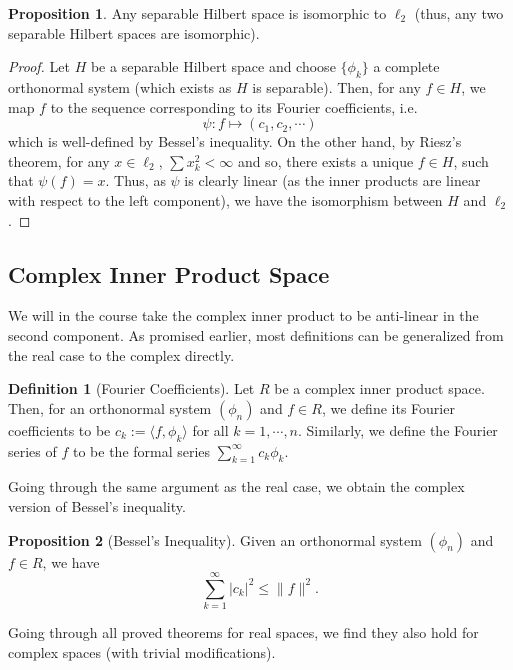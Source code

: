 \documentclass[]{article}
\theoremstyle{definition}
\theoremstyle{definition}
\newtheorem{definition}{Definition}[section]
\newtheorem{proposition}{Proposition}[section]
\begin{document}
\begin{proposition}
  Any separable Hilbert space is isomorphic to \(\ell_2\) (thus, any two separable 
  Hilbert spaces are isomorphic). 
\end{proposition}
\begin{proof}
  Let \(H\) be a separable Hilbert space and choose \(\{\phi_k\}\) a complete 
  orthonormal system (which exists as \(H\) is separable). Then, for any \(f \in H\), 
  we map \(f\) to the sequence corresponding to its Fourier coefficients, i.e.
  \[\psi : f \mapsto (c_1, c_2, \cdots)\]
  which is well-defined by Bessel's inequality. On the other hand, by Riesz's 
  theorem, for any \(x \in \ell_2\), \(\sum x_k^2 < \infty\) and so, there 
  exists a unique \(f \in H\),  such that \(\psi(f) = x\). Thus, as \(\psi\) is 
  clearly linear (as the inner products are linear with respect to the left 
  component), we have the isomorphism between \(H\) and \(\ell_2\).
\end{proof}

\subsection{Complex Inner Product Space}

We will in the course take the complex inner product to be anti-linear in the 
second component. As promised earlier, most definitions can be generalized 
from the real case to the complex directly.

\begin{definition}[Fourier Coefficients]
  Let \(R\) be a complex inner product space. Then, for an orthonormal system 
  \((\phi_n)\) and \(f \in R\), we define its Fourier coefficients to be 
  \(c_k := \langle f, \phi_k\rangle\) for all \(k = 1, \cdots, n\). Similarly,
  we define the Fourier series of \(f\) to be the formal series 
  \(\sum_{k = 1}^\infty c_k \phi_k\).
\end{definition}

Going through the same argument as the real case, we obtain the complex version 
of Bessel's inequality.

\begin{proposition}[Bessel's Inequality]
  Given an orthonormal system \((\phi_n)\) and \(f \in R\), we have 
  \[\sum_{k = 1}^\infty |c_k|^2 \le \|f\|^2.\]
\end{proposition}

Going through all proved theorems for real spaces, we find they also hold for 
complex spaces (with trivial modifications).
\end{document}
